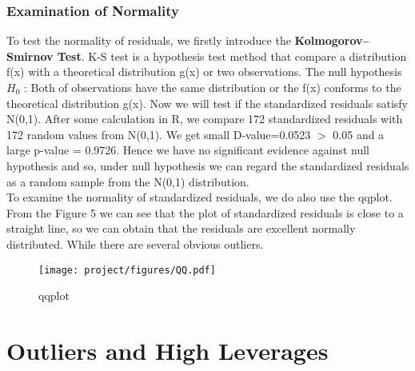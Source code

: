 \documentclass[a4paper]{article}
\begin{document}

\subsubsection{Examination of Normality}
To test the normality of residuals, we firstly introduce the  \textbf{Kolmogorov–Smirnov Test}. K-S test is a hypothesis test method that compare a distribution f(x) with a theoretical distribution g(x) or two observations. The null hypothesis $H_0$ : Both of observations have the same distribution or the f(x) conforms to the theoretical distribution g(x). Now we will test if the standardized residuals satisfy N(0,1). After some calculation in R, we compare 172 standardized residuals with 172 random values from N(0,1). We get small D-value=0.0523 $>$ 0.05 and a large p-value = 0.9726. Hence we have no  significant evidence against null hypothesis and so, under null hypothesis we can regard the standardized residuals as a random sample from the N(0,1) distribution.\\[4pt]

\noindent
To examine the normality of standardized residuals, we do also use the qqplot. From the Figure 5 we can see that the plot of standardized residuals is close to a straight line, so we can obtain that the residuals are excellent normally distributed. While there are several obvious outliers.
\begin{figure}[!htb]
	\centering
	\texttt{[image: project/figures/QQ.pdf]}
	\caption{qqplot}
	\label{6}
\end{figure}

\noindent











\section{Outliers and High Leverages}
\end{document}

